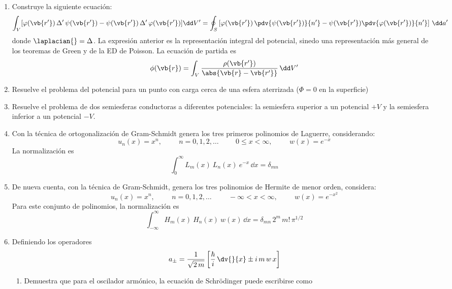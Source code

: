 \begin{enumerate}
\item \label{p1-Greiner} Construye la siguiente ecuación:
\[ \int_{V} [ \varphi(\vb{r^{\prime}}) \, \Delta^{\prime} \, \psi (\vb{r^{\prime}}) -  \psi (\vb{r^{\prime}}) \, \Delta^{\prime} \, \varphi (\vb{r^{\prime}})] \dd V^{\prime} = \oint_{S} \left[ \varphi (\vb{r^\prime}) \, \pdv{\psi (\vb{r^{\prime}})}{n^{\prime}} - \psi (\vb{r^{\prime}}) \pdv{\varphi (\vb{r^{\prime}})}{n^{\prime}} \right] \, \dd a^{\prime} \]
donde $\laplacian{} = \Delta$. La expresión anterior es la representación integral del potencial, sinedo una representación más general de los teoremas de Green y de la ED de Poisson. La ecuación de partida es
\[ \phi (\vb{r}) = \int_{V} \dfrac{\rho (\vb{r^{\prime}})}{\abs{\vb{r} - \vb{r^{\prime}}}} \, \dd V^{\prime} \]
\item \label{p2-Greiner} Resuelve el problema del potencial para un punto con carga cerca de una esfera aterrizada ($\Phi = 0$ en la superficie)
\item \label{p3-Greiner} Resuelve el problema de dos semiesferas conductoras a diferentes potenciales: la semiesfera superior a un potencial $+V$ y la semiesfera inferior a un potencial $-V$.
\item Con la técnica de ortogonalización de Gram-Schmidt genera los tres primeros polinomios de Laguerre, considerando:
\[ u_{n} (x) = x^{n}, \hspace{1cm} n = 0, 1, 2, \ldots \hspace{1cm} 0 \leq x < \infty, \hspace{1cm} w(x) = e^{-x} \]
La normalización es
\[ \int_{0}^{\infty} L_{m} (x) \: L_{n} (x) \: e^{-x} \, \dd x = \delta_{mn} \]
\item De nueva cuenta, con la técnica de Gram-Schmidt, genera los tres polinomios de Hermite de menor orden, considera:
\[ u_{n} (x) = x^{n}, \hspace{1cm} n = 0, 1, 2, \ldots \hspace{1cm} -\infty < x < \infty, \hspace{1cm} w(x) = e^{-x^{2}} \]
Para este conjunto de polinomios, la normalización es
\[ \int_{-\infty}^{\infty} H_{m} (x) \: H_{n} (x) \: w(x) \, \dd x = \delta_{mn} \, 2^{m} \, m! \, \pi^{1/2} \]
\item Definiendo los operadores
\[ a_{\pm} = \dfrac{1}{\sqrt{2 \, m}} \left[ \dfrac{\hbar}{i} \, \dv{}{x} \pm i \, m \, w \, x \right] \]
\begin{enumerate}[label=\roman*)]
\item Demuestra que para el oscilador armónico, la ecuación de Schrödinger puede escribirse como

\end{enumerate}
\end{enumerate}

